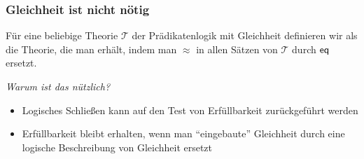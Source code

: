 \documentclass[aspectratio=1610,onlymath]{beamer}
\begin{document}
\begin{frame}\frametitle{Gleichheit ist nicht nötig}

Für eine beliebige Theorie $\mathcal{T}$ der Prädikatenlogik mit Gleichheit
definieren wir  als die Theorie, die man erhält,
indem man $\approx$ in allen Sätzen von $\mathcal{T}$ durch $\textsf{eq}$ ersetzt.
\bigskip

\pause

\emph{Warum ist das nützlich?}
\begin{itemize}
\item Logisches Schließen kann auf den Test von Erfüllbarkeit zurückgeführt werden
\item Erfüllbarkeit bleibt erhalten, wenn man "`eingebaute"' Gleichheit durch eine logische 
Beschreibung von Gleichheit ersetzt
\end{itemize}

\end{frame}
\end{document}
